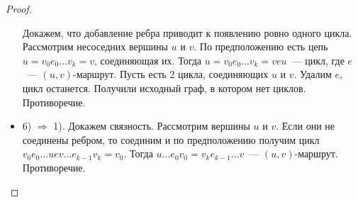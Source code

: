 \begin{proof}
\begin{itemize}
	Докажем, что добавление ребра приводит к появлению ровно одного цикла. Рассмотрим несоседних вершины $u$ и $v$. По предположению есть цепь $u = v_0 e_0 \ldots v_k = v$, соединяющая их. Тогда $u = v_0 e_0 \ldots v_k = v e u$~--- цикл, где $e$~--- $(u, v)$-маршрут. Пусть есть 2 цикла, соединяющих $u$ и $v$. Удалим $e$, цикл останется. Получили исходный граф, в котором нет циклов. Противоречие.
	
	\item 6) $\Rightarrow$ 1). Докажем связность. Рассмотрим вершины $u$ и $v$. Если они не соединены ребром, то соединим и по предположению получим цикл $v_0 e_0 \ldots u e v \ldots e_{k-1} v_k = v_0$. Тогда $u \ldots e_0 v_0 = v_k e_{k-1} \ldots v$~--- $(u, v)$-маршрут. Противоречие.
\end{itemize}
\end{proof}

 



